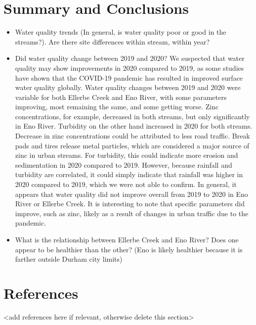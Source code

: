 \documentclass[
  12pt,
]{article}
\begin{document}
\newpage

\hypertarget{summary-and-conclusions}{%
\section{Summary and Conclusions}\label{summary-and-conclusions}}

\begin{itemize}
\item
  Water quality trends (In general, is water quality poor or good in the
  streams?). Are there site differences within stream, within year?
\item
  Did water quality change between 2019 and 2020? We suspected that
  water quality may show improvements in 2020 compared to 2019, as some
  studies have shown that the COVID-19 pandemic has resulted in improved
  surface water quality globally. Water quality changes between 2019 and
  2020 were variable for both Ellerbe Creek and Eno River, with some
  parameters improving, most remaining the same, and some getting worse.
  Zinc concentrations, for example, decreased in both streams, but only
  significantly in Eno River. Turbidity on the other hand increased in
  2020 for both streams. Decrease in zinc concentrations could be
  attributed to less road traffic. Break pads and tires release metal
  particles, which are considered a major source of zinc in urban
  streams. For turbidity, this could indicate more erosion and
  sedimentation in 2020 compared to 2019. However, because rainfall and
  turbidity are correlated, it could simply indicate that rainfall was
  higher in 2020 compared to 2019, which we were not able to confirm. In
  general, it appears that water quality did not improve overall from
  2019 to 2020 in Eno River or Ellerbe Creek. It is interesting to note
  that specific parameters did improve, such as zinc, likely as a result
  of changes in urban traffic due to the pandemic.
\item
  What is the relationship between Ellerbe Creek and Eno River? Does one
  appear to be healthier than the other? (Eno is likely healthier
  because it is farther outside Durham city limits)
\end{itemize}

\newpage

\hypertarget{references}{%
\section{References}\label{references}}

\textless add references here if relevant, otherwise delete this
section\textgreater{}
\end{document}
